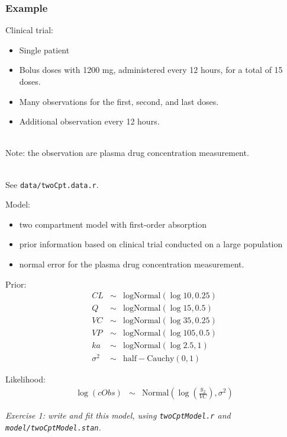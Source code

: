 \documentclass[xcolor=table]{beamer}
\begin{document}
\begin{frame}
  \frametitle{Example}
  Clinical trial:
  \begin{itemize}
    \item Single patient
    \item Bolus doses with 1200 mg, administered every 12 hours, for a total of 15 doses.
    \item Many observations for the first, second, and last doses.
    \item Additional observation every 12 hours.
  \end{itemize}

  \ \\ Note: the observation are plasma drug concentration measurement.

  \ \\ See \texttt{data/twoCpt.data.r}.
\end{frame}

\begin{frame}
  
  Model:
  \begin{itemize}
    \item two compartment model with first-order absorption
    \item prior information based on clinical trial conducted on a large population
    \item normal error for the plasma drug concentration measurement.
  \end{itemize}

\end{frame}

\begin{frame}
  Prior:
  \begin{eqnarray*}
    CL & \sim & \mathrm{logNormal}(\log 10, 0.25) \\
    Q & \sim & \mathrm{logNormal}(\log 15, 0.5) \\
    VC & \sim & \mathrm{logNormal}(\log 35, 0.25) \\
    VP & \sim & \mathrm{logNormal}(\log 105, 0.5) \\
    ka & \sim & \mathrm{logNormal}(\log 2.5, 1) \\
    \sigma^2 & \sim & \mathrm{half-Cauchy}(0, 1)
  \end{eqnarray*}
  
  Likelihood:
  \begin{eqnarray*}
    \log(cObs) & \sim & \mathrm{Normal}\left( \log \left(\frac{y_2}{VC} \right), \sigma^2 \right) 
  \end{eqnarray*}
  
   \textit{\textcolor{MRGGreen}{Exercise 1}: write and fit this model, 
   using \texttt{twoCptModel.r} and  \texttt{model/twoCptModel.stan}.}

\end{frame}
\end{document}
